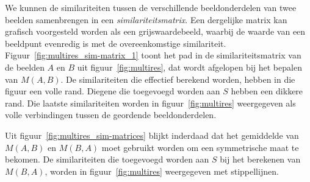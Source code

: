 
We kunnen de similariteiten tussen de verschillende beeldonderdelen van twee beelden
samenbrengen in een \emph{similariteitsmatrix}. Een dergelijke matrix kan grafisch 
voorgesteld worden als een grijswaardebeeld, waarbij de waarde van een beeldpunt evenredig is met
de overeenkomstige similariteit. Figuur~\ref{fig:multires_sim-matrix_1} toont het pad in de 
similariteitsmatrix van de beelden $A$ en $B$ uit figuur~\ref{fig:multires}, dat wordt afgelopen
bij het bepalen van $M(A,B)$.
De similariteiten die effectief berekend worden, hebben in die figuur een volle rand. Diegene 
die toegevoegd worden aan $S$ hebben een dikkere rand. Die laatste similariteiten 
worden in figuur~\ref{fig:multires} weergegeven als volle verbindingen tussen de
geordende beeldonderdelen. 

Uit figuur~\ref{fig:multires_sim-matrices} blijkt inderdaad dat
het gemiddelde van $M(A,B)$ en $M(B,A)$ moet gebruikt worden om een symmetrische maat te bekomen.
De similariteiten die toegevoegd worden aan $S$ bij het berekenen van $M(B,A)$, worden in 
figuur~\ref{fig:multires} weergegeven met stippellijnen.


